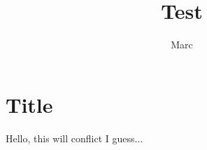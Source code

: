 \documentclass{article}
\begin{document}
\author{Marc}
\title{Test}
\maketitle

\section{Title}
\label{sec:title}
Hello, this will conflict I guess...
\end{document}
